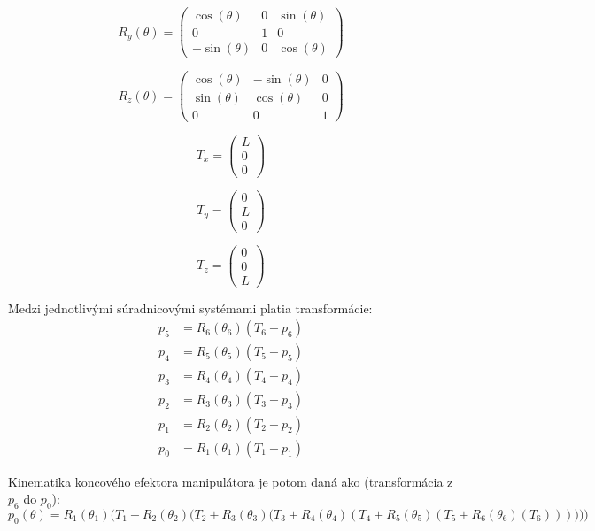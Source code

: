 \begin{equation}
R_y(\theta) = \begin{pmatrix} \cos(\theta) & 0 & \sin(\theta) \\ 0 & 1 & 0 \\ -\sin(\theta) & 0 & \cos(\theta) \end{pmatrix}
\end{equation}

\begin{equation}
R_z(\theta) = \begin{pmatrix} \cos(\theta) & -\sin(\theta) & 0 \\ \sin(\theta) & \cos(\theta) & 0 \\ 0 & 0 & 1 \end{pmatrix}
\end{equation}

\begin{equation}
T_x = \begin{pmatrix} L \\ 0 \\ 0 \end{pmatrix}
\end{equation}

\begin{equation}
T_y = \begin{pmatrix} 0 \\ L \\ 0 \end{pmatrix}
\end{equation}

\begin{equation}
T_z = \begin{pmatrix} 0 \\ 0 \\ L \end{pmatrix}
\end{equation}

Medzi jednotlivými súradnicovými systémami platia transformácie:
\begin{align}
p_5 &= R_6(\theta_6)(T_6 + p_6) \\
p_4 &= R_5(\theta_5)(T_5 + p_5) \\
p_3 &= R_4(\theta_4)(T_4 + p_4) \\
p_2 &= R_3(\theta_3)(T_3 + p_3) \\
p_1 &= R_2(\theta_2)(T_2 + p_2) \\
p_0 &= R_1(\theta_1)(T_1 + p_1)
\end{align}

Kinematika koncového efektora manipulátora je potom daná ako (transformácia z $p_6$ do $p_0$):
\begin{equation} \label{eq:p0_theta}
p_0(\theta) = R_1(\theta_1)\Bigg(T_1 + R_2(\theta_2)\Big(T_2 + R_3(\theta_3)\big(T_3 + R_4(\theta_4)\left(T_4 + R_5(\theta_5)\left(T_5 + R_6(\theta_6)(T_6)\right)\right)\big)\Big)\Bigg)
\end{equation}

